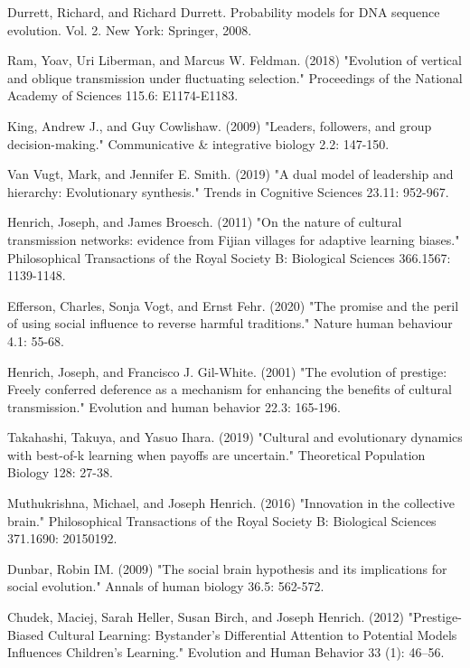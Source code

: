 \documentclass[12pt]{extarticle}
\begin{document}
\begin{thebibliography}{}
Durrett, Richard, and Richard Durrett. Probability models for DNA sequence evolution. Vol. 2. New York: Springer, 2008.

Ram, Yoav, Uri Liberman, and Marcus W. Feldman. (2018) "Evolution of vertical and oblique transmission under fluctuating selection." Proceedings of the National Academy of Sciences 115.6: E1174-E1183.

King, Andrew J., and Guy Cowlishaw. (2009) "Leaders, followers, and group decision-making." Communicative \& integrative biology 2.2: 147-150.

Van Vugt, Mark, and Jennifer E. Smith. (2019) "A dual model of leadership and hierarchy: Evolutionary synthesis." Trends in Cognitive Sciences 23.11: 952-967.

Henrich, Joseph, and James Broesch. (2011) "On the nature of cultural transmission networks: evidence from Fijian villages for adaptive learning biases." Philosophical Transactions of the Royal Society B: Biological Sciences 366.1567: 1139-1148.

Efferson, Charles, Sonja Vogt, and Ernst Fehr. (2020) "The promise and the peril of using social influence to reverse harmful traditions." Nature human behaviour 4.1: 55-68.

Henrich, Joseph, and Francisco J. Gil-White. (2001) "The evolution of prestige: Freely conferred deference as a mechanism for enhancing the benefits of cultural transmission." Evolution and human behavior 22.3: 165-196.

Takahashi, Takuya, and Yasuo Ihara. (2019) "Cultural and evolutionary dynamics with best-of-k learning when payoffs are uncertain." Theoretical Population Biology 128: 27-38.

Muthukrishna, Michael, and Joseph Henrich. (2016) "Innovation in the collective brain." Philosophical Transactions of the Royal Society B: Biological Sciences 371.1690: 20150192.

Dunbar, Robin IM. (2009) "The social brain hypothesis and its implications for social evolution." Annals of human biology 36.5: 562-572.

Chudek, Maciej, Sarah Heller, Susan Birch, and Joseph Henrich. (2012) "Prestige-Biased Cultural Learning: Bystander’s Differential Attention to Potential Models Influences Children’s Learning." Evolution and Human Behavior 33 (1): 46–56.


\end{thebibliography}
\end{document}
